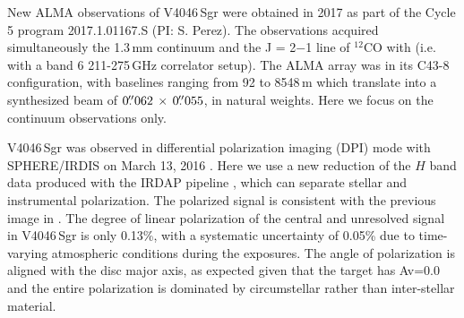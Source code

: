 \documentclass[letters,usenatbib,times]{mnras}
\begin{document}

New ALMA observations of V4046\,Sgr were obtained in 2017 as part of the Cycle 5 program 2017.1.01167.S (PI: S. Perez).  The observations  acquired simultaneously the 1.3\,mm continuum and the J = 2$-$1 line of $^{12}$CO with  (i.e. with a  band 6 211-275\,GHz correlator setup). The ALMA array was in its C43-8 configuration, with baselines ranging from 92 to 8548\,m which translate into a synthesized beam of $0\hbox{$.\!\!^{\prime\prime}$}062 \,\times \, 0\hbox{$.\!\!^{\prime\prime}$}055$, in  natural weights. Here we focus on the continuum observations only.

V4046\,Sgr was observed in differential polarization imaging (DPI) mode with SPHERE/IRDIS on March 13, 2016 \citep[see][for details]{Avenhaus_2018}. Here we use a new reduction of the $H$ band data produced with the IRDAP pipeline \citep{2020A&A...633A..64V}, which can separate stellar and instrumental polarization. The polarized signal is consistent with the previous image in \citet{Avenhaus_2018}. The degree of linear polarization of the central and unresolved signal in V4046\,Sgr is only 0.13\%, with a systematic uncertainty of 0.05\% due to time-varying atmospheric conditions during the exposures. The angle of polarization is aligned with the disc major axis, as expected given that the target has Av=0.0 \citep{2016ApJ...828...69M} and the entire polarization is dominated by circumstellar rather than inter-stellar material. 
\end{document}
